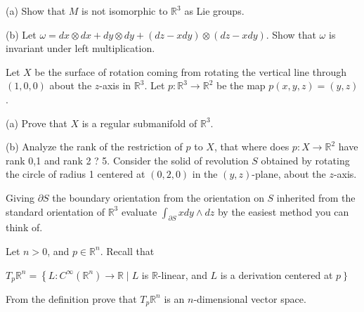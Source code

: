 \documentclass[14pt]{extarticle}
\begin{document}
(a) Show that $M$ is not isomorphic to $\mathbb{R}^{3}$ as Lie groups.

(b) Let $\omega=d x \otimes d x+d y \otimes d y+(d z-x d y) \otimes(d z-x d y)$. Show that $\omega$ is invariant under left multiplication.

\newpage
Let $X$ be the surface of rotation coming from rotating the vertical line through $(1,0,0)$ about the $z$-axis in $\mathbb{R}^{3}$. Let $p: \mathbb{R}^{3} \rightarrow \mathbb{R}^{2}$ be the map $p(x, y, z)=(y, z)$.

(a) Prove that $X$ is a regular submanifold of $\mathbb{R}^{3}$.

(b) Analyze the rank of the restriction of $p$ to $X$, that where does $p: X \rightarrow \mathbb{R}^{2}$ have rank 0,1 and rank 2 ? 5. Consider the solid of revolution $S$ obtained by rotating the circle of radius 1 centered at $(0,2,0)$ in the $(y, z)$-plane, about the $z$-axis.

Giving $\partial S$ the boundary orientation from the orientation on $S$ inherited from the standard orientation of $\mathbb{R}^{3}$ evaluate $\int_{\partial S} x d y \wedge d z$ by the easiest method you can think of.

\newpage
Let $n>0$, and $p \in \mathbb{R}^{n}$. Recall that

$T_{p} \mathbb{R}^{n}=\left\{L: C^{\infty}\left(\mathbb{R}^{n}\right) \rightarrow \mathbb{R} \mid L\right.$ is $\mathbb{R}$-linear, and $L$ is a derivation centered at $\left.p\right\}$

From the definition prove that $T_{p} \mathbb{R}^{n}$ is an $n$-dimensional vector space.
\end{document}
